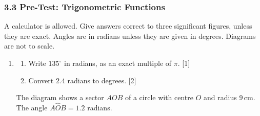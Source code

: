 \documentclass[12pt, twoside]{article}
\begin{document}
\subsubsection*{3.3 Pre-Test: Trigonometric Functions}

A calculator is allowed. Give answers correct to three significant figures,
unless they are exact. Angles are in radians unless they are given in
degrees. Diagrams are not to scale.

\begin{enumerate}[itemsep=0.15cm]

\item[1.] [Maximum mark: 9]

\begin{center}
\end{center}

\begin{enumerate}[itemsep=0.1cm]
  \item Write $135^\circ$ in radians, as an exact multiple of $\pi$.
  \hfill [1]
  \item Convert $2.4$ radians to degrees. \hfill [2]
\end{enumerate}

\begin{minipage}[t]{0.62\linewidth}
The diagram shows a sector $AOB$ of a circle with centre $O$ and radius
$9\,\text{cm}$. The angle $A\hat{O}B = 1.2$ radians.
\end{minipage}
\hfill
\begin{minipage}[t]{0.33\linewidth}
\vspace{0pt}
\end{minipage}


\end{enumerate}
\end{document}
